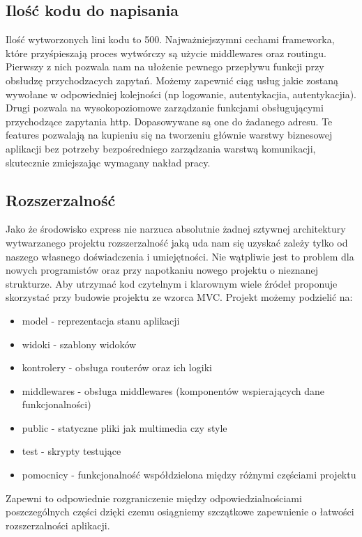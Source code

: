 \documentclass[12pt]{report}
\begin{document}
    \subsection{Ilość kodu do napisania}
      Ilość wytworzonych lini kodu to 500. 
      Najważniejszymni cechami frameworka, które przyśpieszają proces wytwórczy są użycie middlewares oraz routingu.
      Pierwszy z nich pozwala nam na ułożenie pewnego przepływu funkcji przy obsłudzę przychodzacych zapytań.
      Możemy zapewnić ciąg usług jakie zostaną wywołane w odpowiedniej kolejności (np logowanie, autentykacjia, autentykacjia).
      Drugi pozwala na wysokopoziomowe zarządzanie funkcjami obsługującymi przychodzące zapytania http.
      Dopasowywane są one do żadanego adresu.
      Te features pozwalają na kupieniu się na tworzeniu głównie warstwy biznesowej aplikacji bez potrzeby bezpośredniego zarządzania warstwą komunikacji, skutecznie zmiejszając wymagany nakład pracy.

    \subsection{Rozszerzalność}
      Jako że środowisko express nie narzuca absolutnie żadnej sztywnej architektury wytwarzanego projektu rozszerzalność jaką uda nam się uzyskać zależy tylko od naszego własnego doświadczenia i umiejętności.
      Nie wątpliwie jest to problem dla nowych programistów oraz przy napotkaniu nowego projektu o nieznanej strukturze.
      Aby utrzymać kod czytelnym i klarownym wiele źródeł proponuje skorzystać przy budowie projektu ze wzorca MVC.
      Projekt możemy podzielić na:
      \begin{itemize}
        \item model - reprezentacja stanu aplikacji
        \item widoki - szablony widoków
        \item kontrolery - obsługa routerów oraz ich logiki
        \item middlewares - obsługa middlewares (komponentów wspierających dane funkcjonalności)
        \item public - statyczne pliki jak multimedia czy style
        \item test - skrypty testujące
        \item pomocnicy - funkcjonalność współdzielona między różnymi częściami projektu
      \end{itemize}
      Zapewni to odpowiednie rozgraniczenie między odpowiedzialnościami poszczególnych części dzięki czemu osiągniemy szczątkowe zapewnienie o łatwości rozszerzalności aplikacji. 
      
\end{document}
